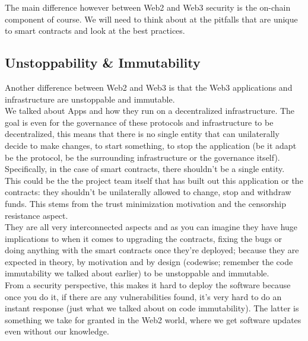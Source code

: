 The main difference however between Web2 and Web3 security is the on-chain component of course.
We will need to think about at the pitfalls that are unique to smart contracts and look at the best practices.

\subsection*{Unstoppability \& Immutability}

Another difference between Web2 and Web3 is that the Web3 applications and infrastructure are unstoppable and immutable.\\

We talked about \DJ Apps and how they run on a decentralized infrastructure.
The goal is even for the governance of these protocols and infrastructure to be decentralized, this means that there is no single entity that can unilaterally decide to make changes, to start something, to stop the application (be it adapt be the protocol, be the surrounding infrastructure or the governance itself).
Specifically, in the case of smart contracts, there shouldn't be a single entity.\\

This could be the the project team itself that has built out this application or the contracts: they shouldn't be unilaterally allowed to change, stop and withdraw funds. 
This stems from the trust minimization motivation and the censorship resistance aspect.\\

They are all very interconnected aspects and as you can imagine they have huge implications to when it comes to upgrading the contracts, fixing the bugs or doing anything with the smart contracts once they're deployed; because they are expected in theory, by motivation and by design (codewise; remember the code immutability we talked about earlier) to be unstoppable and immutable.\\

From a security perspective, this makes it hard to deploy the software because once you do it, if there are any vulnerabilities found, it's very hard to do an instant response (just what we talked about on code immutability).
The latter is something we take for granted in the Web2 world, where we get software updates even without our knowledge.\\

